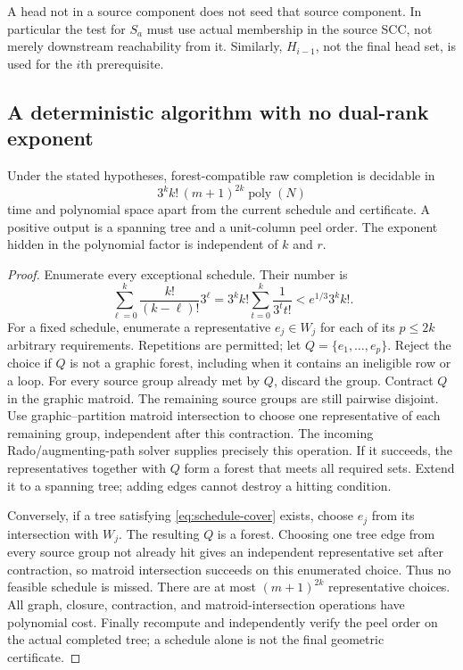 A head not in a source component does not seed that source component.
In particular the test for $S_a$ must use actual membership in the source
SCC, not merely downstream reachability from it.  Similarly, $H_{i-1}$,
not the final head set, is used for the $i$th prerequisite.

\subsection{A deterministic algorithm with no dual-rank exponent}

\begin{theorem}
\label{thm:triple-xp}
Under the stated hypotheses, forest-compatible raw completion is decidable
in
\[
            3^k k!\,(m+1)^{2k}\operatorname{poly}(N)
\]
time and polynomial space apart from the current schedule and certificate.
A positive output is a spanning tree and a unit-column peel order.  The exponent hidden in the polynomial factor is independent of $k$ and $r$.
\end{theorem}
\begin{proof}
Enumerate every exceptional schedule.  Their number is
\[
    \sum_{\ell=0}^{k}\frac{k!}{(k-\ell)!}3^\ell
       =3^k k!\sum_{t=0}^k\frac{1}{3^t t!}
       <e^{1/3}3^k k!.
\]
For a fixed schedule, enumerate a representative $e_j\in W_j$ for each
of its $p\leq2k$ arbitrary requirements.  Repetitions are permitted; let
$Q=\{e_1,\ldots,e_p\}$.  Reject the choice if $Q$ is not a graphic
forest, including when it contains an ineligible row or a loop.
For every source group already met by $Q$, discard the group.  Contract
$Q$ in the graphic matroid.  The remaining source groups are still
pairwise disjoint.  Use graphic--partition matroid intersection to choose
one representative of each remaining group, independent after this
contraction.  The incoming Rado/augmenting-path solver supplies precisely
this operation.  If it succeeds, the representatives together with $Q$
form a forest that meets all required sets.  Extend it to a spanning tree;
adding edges cannot destroy a hitting condition.

Conversely, if a tree satisfying \eqref{eq:schedule-cover} exists, choose
$e_j$ from its intersection with $W_j$.  The resulting $Q$ is a forest.
Choosing one tree edge from every source group not already hit gives an
independent representative set after contraction, so matroid intersection
succeeds on this enumerated choice.  Thus no feasible schedule is missed.
There are at most $(m+1)^{2k}$ representative choices.  All graph, closure,
contraction, and matroid-intersection operations have polynomial cost.
Finally recompute and independently verify the peel order on the actual
completed tree; a schedule alone is not the final geometric certificate.
\end{proof}

